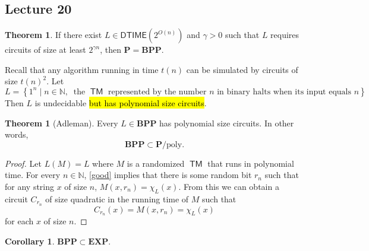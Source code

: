 \documentclass[10pt,letterpaper,cm]{nupset}
\theoremstyle{definition}
\theoremstyle{theorem}
\newtheorem{theorem}[definition]{Theorem}
\newtheorem{corollary}[definition]{Corollary}
\theoremstyle{remark}
\newcommand{\N}{\mathbb N}
\newcommand{\1}{\mathbf{1}}
\newcommand{\0}{\vec 0}
\DeclareMathOperator{\TM}{\mathsf{TM}}
\begin{document}
\subsection{Lecture 20}

\begin{theorem}
If there exist $L \in \mathsf{DTIME}\left(2^{O(n)}\right)$ and $\gamma >0$ such that $L$ requires circuits of size at least $2^{\gamma{n}}$, then $\mathbf{P} = \mathbf{BPP}$.
\end{theorem}

\smallskip

Recall that any algorithm running in time $t(n)$ can be simulated by circuits of size $t(n)^2$. Let $$L = \left\{ 1^n \mid n \in \N, \ \text{ the }\TM\text{ represented by the number }n\text{ in binary halts when its input equals }n\right\}.$$ Then $L$ is undecidable \hl{but has polynomial size circuits}. 

\smallskip

\begin{theorem}[Adleman]
Every $L\in \mathbf{BPP}$ has polynomial size circuits. In other words, $$\mathbf{BPP} \subset \mathbf{P}/\mathrm{poly}.$$
\end{theorem}
\begin{proof}
Let $L(M)  = L$ where $M$ is a randomized $\TM$ that runs in polynomial time. For every $n\in \N$, \cref{good} implies that there is some random bit $r_n$ such that for any string $x$ of size $n$, $M(x,r_n) = \chi_L(x)$. From this we can obtain a circuit $C_{r_n}$ of size quadratic in the running time of $M$ such that $$C_{r_n}(x) = M(x,{r_n}) = \chi_L(x)$$ for each $x$ of size $n$.
\end{proof}

\begin{corollary}
$\mathbf{BPP} \subset \mathbf{EXP}$.
\end{corollary}
\end{document}
